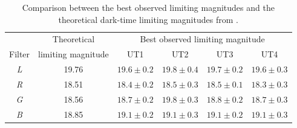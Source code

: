 \begin{colsection}
\begin{colsection}
\begin{table}[p]
    \begin{center}
        \begin{tabular}{c|c|cccc} %
             &
            Theoretical &
            \multicolumn{4}{c}{Best observed limiting magnitude}
            \\
            Filter & limiting magnitude & UT1 & UT2 & UT3 & UT4 \\
            \midrule
            \textit{L} & 19.76 & $19.6 \pm 0.2$ & $19.8 \pm 0.4$ & $19.7 \pm 0.2$ & $19.6 \pm 0.3$ \\
            \textit{R} & 18.51 & $18.4 \pm 0.2$ & $18.5 \pm 0.3$ & $18.5 \pm 0.1$ & $18.3 \pm 0.3$ \\
            \textit{G} & 18.56 & $18.7 \pm 0.2$ & $19.8 \pm 0.3$ & $18.8 \pm 0.2$ & $18.7 \pm 0.3$ \\
            \textit{B} & 18.85 & $19.1 \pm 0.2$ & $19.1 \pm 0.3$ & $19.1 \pm 0.2$ & $19.1 \pm 0.3$ \\
        \end{tabular}
    \end{center}
    \caption[Comparison between theoretical and observed limiting magnitudes]{
        Comparison between the best observed limiting magnitudes and the theoretical dark-time limiting magnitudes from .
    }\label{tab:lms_comparison}
\end{table}

\clearpage

\end{colsection}


\end{colsection}

